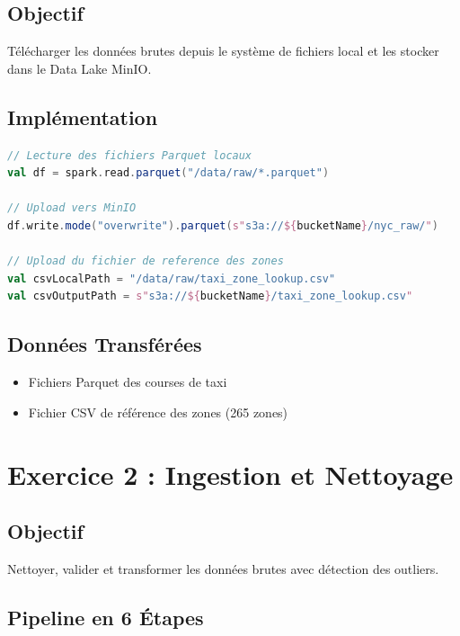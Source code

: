 \documentclass[12pt,a4paper]{report}
\begin{document}
\subsection{Objectif}

Télécharger les données brutes depuis le système de fichiers local et les stocker dans le Data Lake MinIO.

\subsection{Implémentation}

\begin{lstlisting}[language=Scala, caption=Upload vers MinIO (Ex01)]
// Lecture des fichiers Parquet locaux
val df = spark.read.parquet("/data/raw/*.parquet")

// Upload vers MinIO
df.write.mode("overwrite").parquet(s"s3a://${bucketName}/nyc_raw/")

// Upload du fichier de reference des zones
val csvLocalPath = "/data/raw/taxi_zone_lookup.csv"
val csvOutputPath = s"s3a://${bucketName}/taxi_zone_lookup.csv"
\end{lstlisting}

\subsection{Données Transférées}

\begin{itemize}
    \item Fichiers Parquet des courses de taxi
    \item Fichier CSV de référence des zones (265 zones)
\end{itemize}

\section{Exercice 2 : Ingestion et Nettoyage}

\subsection{Objectif}

Nettoyer, valider et transformer les données brutes avec détection des outliers.

\subsection{Pipeline en 6 Étapes}
\end{document}
